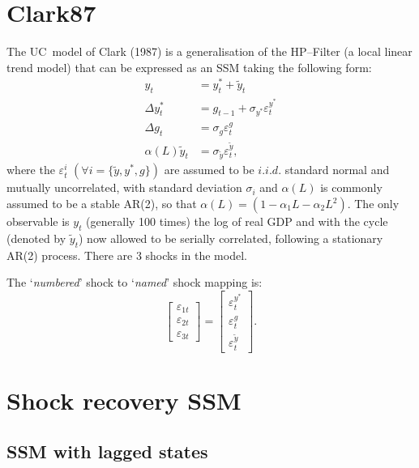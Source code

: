 \documentclass[a4paper,12pt]{article}
\newcommand{\bsq}{\begin{subequations}}\newcommand{\esq}{\end{subequations}}
\begin{document}
\section{Clark87}

The UC\ model of Clark (1987) is a generalisation of the HP--Filter (a local
linear trend model) that can be expressed as an SSM taking the following
form:\bsq\label{clark0}%
\begin{align}
y_{t}& =y_{t}^{\ast }+\tilde{y}_{t} \\
\Delta y_{t}^{\ast }& =g_{t-1}+\sigma _{y^{\ast }}\varepsilon _{t}^{y^{\ast
}} \\
\Delta g_{t}& =\sigma _{g}\varepsilon _{t}^{g} \\
\alpha (L)\tilde{y}_{t}& =\sigma _{\tilde{y}}\varepsilon _{t}^{\tilde{y}},
\end{align}%
\esq where the $\varepsilon _{t}^{i}$ $(\forall i=\{\tilde{y},y^{\ast },g\})$
are assumed to be $i.i.d.$ standard normal and mutually uncorrelated, with
standard deviation $\sigma _{i}$ and $\alpha (L)$ is commonly assumed to be
a stable AR(2), so that $\alpha (L)=(1-\alpha _{1}L-\alpha _{2}L^{2})$. The
only observable is $y_{t}$ (generally 100 times) the log of real GDP and
with the cycle (denoted by $\tilde{y}_{t}$) now allowed to be serially
correlated, following a stationary AR(2) process. There are 3 shocks in the
model.

The `\emph{numbered}' shock to `\emph{named}' shock mapping is:%
\begin{equation}
\begin{bmatrix}
\varepsilon _{1t} \\ 
\varepsilon _{2t} \\ 
\varepsilon _{3t}%
\end{bmatrix}%
=%
\begin{bmatrix}
\varepsilon _{t}^{y^{\ast }} \\ 
\varepsilon _{t}^{g} \\ 
\varepsilon _{t}^{\tilde{y}}%
\end{bmatrix}%
.
\end{equation}

\section{Shock recovery SSM}

\subsection{SSM with lagged states}
\end{document}
